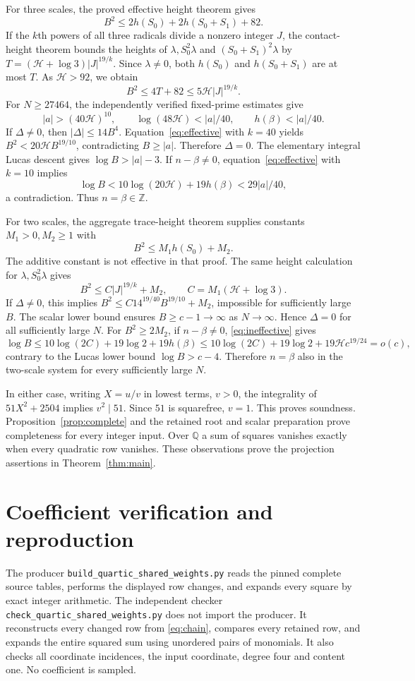 \documentclass[11pt,a4paper]{article}
\theoremstyle{remark}\newtheorem{remark}[theorem]{Remark}
\newcommand{\Q}{\mathbb Q}\newcommand{\Z}{\mathbb Z}\newcommand{\HH}{\mathcal H}
\begin{document}
For three scales, the proved effective height theorem gives
\[
 B^2\le2h(S_0)+2h(S_0+S_1)+82.
\]
If the $k$th powers of all three radicals divide a nonzero integer $J$,
the contact-height theorem bounds the heights of $\lambda,S_0^2\lambda$
and $(S_0+S_1)^2\lambda$ by
$T=(\HH+\log3)|J|^{19/k}$. Since $\lambda\ne0$, both $h(S_0)$ and
$h(S_0+S_1)$ are at most $T$. As $\HH>92$, we obtain
\begin{equation}\label{eq:effective}
 B^2\le4T+82\le5\HH|J|^{19/k}.
\end{equation}
For $N\ge27464$, the independently verified fixed-prime estimates give
\[
 |a|>(40\HH)^{10},\qquad \log(48\HH)<|a|/40,
 \qquad h(\beta)<|a|/40.
\]
If $\Delta\ne0$, then $|\Delta|\le14B^4$. Equation~\eqref{eq:effective}
with $k=40$ yields
$B^2<20\HH B^{19/10}$, contradicting $B\ge|a|$. Therefore $\Delta=0$.
The elementary integral Lucas descent gives $\log B>|a|-3$.
If $n-\beta\ne0$, equation~\eqref{eq:effective} with $k=10$ implies
\[
 \log B<10\log(20\HH)+19h(\beta)<29|a|/40,
\]
a contradiction. Thus $n=\beta\in\Z$.

For two scales, the aggregate trace-height theorem supplies constants
$M_1>0,M_2\ge1$ with
\[
 B^2\le M_1h(S_0)+M_2.
\]
The additive constant is not effective in that proof. The same
height calculation for $\lambda,S_0^2\lambda$ gives
\begin{equation}\label{eq:ineffective}
 B^2\le C|J|^{19/k}+M_2,\qquad C=M_1(\HH+\log3).
\end{equation}
If $\Delta\ne0$, this implies
$B^2\le C14^{19/40}B^{19/10}+M_2$, impossible for sufficiently large $B$.
The scalar lower bound ensures $B\ge c-1\to\infty$ as $N\to\infty$.
Hence $\Delta=0$ for all sufficiently large $N$. For $B^2\ge2M_2$,
if $n-\beta\ne0$, \eqref{eq:ineffective} gives
\[
 \log B\le10\log(2C)+19\log2+19h(\beta)
 \le10\log(2C)+19\log2+19\HH c^{19/24}=o(c),
\]
contrary to the Lucas lower bound $\log B>c-4$. Therefore $n=\beta$
also in the two-scale system for every sufficiently large $N$.

In either case, writing $X=u/v$ in lowest terms, $v>0$, the integrality
of $51X^2+2504$ implies $v^2\mid51$. Since $51$ is squarefree, $v=1$.
This proves soundness. Proposition~\ref{prop:complete} and the retained
root and scalar preparation prove completeness for every integer input.
Over $\Q$ a sum of squares vanishes exactly when every quadratic row
vanishes. These observations prove the projection assertions in
Theorem~\ref{thm:main}.

\section{Coefficient verification and reproduction}
The producer \nolinkurl{build_quartic_shared_weights.py} reads the
pinned complete source tables, performs the displayed row changes, and
expands every square by exact integer arithmetic. The independent checker
\nolinkurl{check_quartic_shared_weights.py} does not import the producer.
It reconstructs every changed row from \eqref{eq:chain}, compares every
retained row, and expands the entire squared sum using unordered pairs
of monomials. It also checks all coordinate incidences, the input
coordinate, degree four and content one. No coefficient is sampled.
\end{document}
